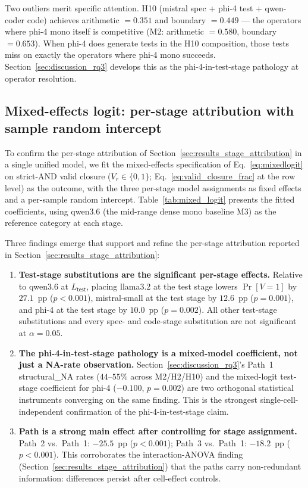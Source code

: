 Two outliers merit specific attention. H10 (mistral spec + phi-4 test + qwen-coder code) achieves arithmetic $= 0.351$ and boundary $= 0.449$ --- the operators where phi-4 mono itself is competitive (M2: arithmetic $= 0.580$, boundary $= 0.653$). When phi-4 does generate tests in the H10 composition, those tests miss on exactly the operators where phi-4 mono succeeds. Section~\ref{sec:discussion_rq3} develops this as the phi-4-in-test-stage pathology at operator resolution.

\subsection{Mixed-effects logit: per-stage attribution with sample random intercept}
\label{sec:results_mixed_logit}

To confirm the per-stage attribution of Section~\ref{sec:results_stage_attribution} in a single unified model, we fit the mixed-effects specification of Eq.~\ref{eq:mixedlogit} on strict-AND valid closure ($V_r \in \{0, 1\}$; Eq.~\ref{eq:valid_closure_frac} at the row level) as the outcome, with the three per-stage model assignments as fixed effects and a per-sample random intercept. Table~\ref{tab:mixed_logit} presents the fitted coefficients, using qwen3.6 (the mid-range dense mono baseline M3) as the reference category at each stage.



Three findings emerge that support and refine the per-stage attribution reported in Section~\ref{sec:results_stage_attribution}:

\begin{enumerate}
  \item \textbf{Test-stage substitutions are the significant per-stage effects.} Relative to qwen3.6 at $L_{\textsf{test}}$, placing llama3.2 at the test stage lowers $\Pr[V=1]$ by $27.1$~pp ($p < 0.001$), mistral-small at the test stage by $12.6$~pp ($p = 0.001$), and phi-4 at the test stage by $10.0$~pp ($p = 0.002$). All other test-stage substitutions and every spec- and code-stage substitution are not significant at $\alpha = 0.05$.
  \item \textbf{The phi-4-in-test-stage pathology is a mixed-model coefficient, not just a NA-rate observation.} Section~\ref{sec:discussion_rq3}'s Path~1 \textsf{structural\_NA} rates ($44$--$55\%$ across M2/H2/H10) and the mixed-logit test-stage coefficient for phi-4 ($-0.100$, $p = 0.002$) are two orthogonal statistical instruments converging on the same finding. This is the strongest single-cell-independent confirmation of the phi-4-in-test-stage claim.
  \item \textbf{Path is a strong main effect after controlling for stage assignment.} Path~2 vs.\ Path~1: $-25.5$~pp ($p < 0.001$); Path~3 vs.\ Path~1: $-18.2$~pp ($p < 0.001$). This corroborates the interaction-ANOVA finding (Section~\ref{sec:results_stage_attribution}) that the paths carry non-redundant information: differences persist after cell-effect controls.
\end{enumerate}

